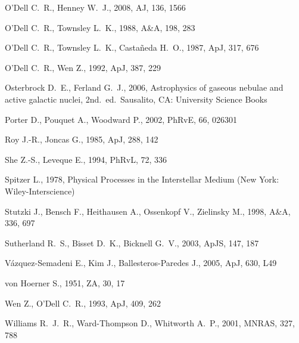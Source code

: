 \documentclass[useAMS,usenatbib]{mn2e}
\begin{document}
\begin{thebibliography}{}
 O'Dell C.~R., Henney W.~J., 2008, AJ, 136, 1566 

 O'Dell C.~R., Townsley L.~K., 1988, A\&A, 198, 283 

 O'Dell C.~R., Townsley
  L.~K., Casta\~neda H.~O., 1987, ApJ, 317, 676 

 O'Dell C.~R., Wen Z., 1992, ApJ, 387, 229 

 Osterbrock D.~E., Ferland
  G.~J., 2006, Astrophysics of gaseous nebulae and active galactic
  nuclei, 2nd.~ed.~Sausalito, CA:
  University Science Books

 Porter D., Pouquet A., Woodward P., 2002, PhRvE, 66, 026301 

 Roy J.-R., Joncas G., 1985, ApJ, 288, 142 

 She Z.-S., Leveque E., 1994, PhRvL, 72, 336 

 Spitzer
  L., 1978, Physical Processes in the Interstellar Medium (New York: Wiley-Interscience)

 Stutzki J., Bensch F., Heithausen A., Ossenkopf V., Zielinsky M., 1998, A\&A, 336, 697 

 Sutherland R.~S., Bisset
  D.~K., Bicknell G.~V., 2003, ApJS, 147, 187 

 V{\'a}zquez-Semadeni E., Kim J., Ballesteros-Paredes J., 2005, ApJ, 630, L49 

von Hoerner S., 1951, ZA, 30, 17 

 Wen Z., O'Dell C.~R., 1993, ApJ, 409, 262 

 Williams R.~J.~R., Ward-Thompson D., Whitworth A.~P., 2001, MNRAS, 327, 788 








\end{thebibliography}




\label{lastpage}
\end{document}

